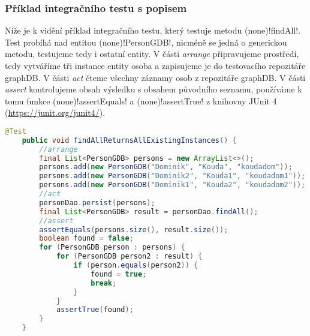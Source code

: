 \subsubsection{Příklad integračního testu s popisem}
Níže je k vidění příklad integračního testu, který testuje metodu \ctulst(none)!findAll!. Test probíhá nad entitou \ctulst(none)!PersonGDB!, nicméně se jedná o generickou metodu, testujeme tedy i ostatní entity. V části \textit{arrange} připravujeme prostředí, tedy vytváříme tři instance entity osoba a zapisujeme je do testovacího repozitáře graphDB. V části \textit{act} čteme všechny záznamy osob z repozitáře graphDB. V části \textit{assert} kontrolujeme obsah výsledku s obsahem původního seznamu, používáme k tomu funkce \ctulst(none)!assertEquals! a \ctulst(none)!assertTrue! z knihovny JUnit 4 (\url{https://junit.org/junit4/}). 
\begin{lstlisting}[language=JAVA, caption= Příklad integračního testu, captionpos=b]
    @Test
    public void findAllReturnsAllExistingInstances() {
        //arrange
        final List<PersonGDB> persons = new ArrayList<>();
        persons.add(new PersonGDB("Dominik", "Kouda", "koudadom"));
        persons.add(new PersonGDB("Dominik2", "Kouda1", "koudadom1"));
        persons.add(new PersonGDB("Dominik1", "Kouda2", "koudadom2"));
        //act
        personDao.persist(persons);
        final List<PersonGDB> result = personDao.findAll();
        //assert
        assertEquals(persons.size(), result.size());
        boolean found = false;
        for (PersonGDB person : persons) {
            for (PersonGDB person2 : result) {
                if (person.equals(person2)) {
                    found = true;
                    break;
                }
            }
            assertTrue(found);
        }
    }
\end{lstlisting}
